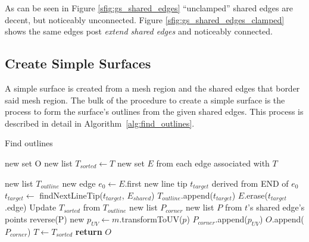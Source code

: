 As can be seen in Figure \ref{sfig:gs_shared_edges} ``unclamped'' shared edges are decent, but noticeably unconnected.
Figure \ref{sfig:gs_shared_edges_clamped} shows the same edges post \textit{extend shared edges} and noticeably connected.

\subsection{Create Simple Surfaces}
A simple surface is created from a mesh region and the shared edges that border said mesh region.
The bulk of the procedure to create a simple surface is the process to form the surface's outlines from the given shared edges.
This process is described in detail in Algorithm~\ref{alg:find_outlines}.

\begin{algorithm}[!htb]
	\caption{Find outlines}\label{alg:find_outlines}
\begin{algorithmic}[1]
	\State new set O 
	\State new list $T_{sorted} \leftarrow T$ 
	\State new set $E$ from each edge associated with $T$

		\State new list $T_{outline}$ 
		\State new edge $e_0 \leftarrow E$.first
		\State new line tip $t_{target}$ derived from END of $e_0$
		\Repeat
			\State $t_{target} \leftarrow$ findNextLineTip($t_{target}$, $E_{shared}$)
			\State $T_{outline}$.append($t_{target}$)
			\State $E$.erase($t_{target}$.edge)
		\State Update $T_{sorted}$ from $T_{outline}$
		\State new list $P_{corner}$
			\State new list $P$ from $t$'s shared edge's points
				\State reverse(P)
			\EndIf
				\State new $p_{UV} \leftarrow m$.transformToUV($p$)
				\State $P_{corner}$.append($p_{UV}$)
			\EndFor
		\EndFor
		\State $O$.append($P_{corner}$)
	\EndWhile
	\State $T \leftarrow T_{sorted}$
	\State \textbf{return} $O$
\EndFunction
\end{algorithmic}
\end{algorithm}


